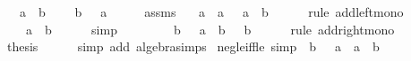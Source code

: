 \begin{isabellebody}
\ \ \ {\isachardoublequoteopen}a\ {\isasymle}\ b{\isachardoublequoteclose}\isanewline
\ \ \ {\isachardoublequoteopen}{\isacharminus}{\kern0pt}\ b\ {\isasymle}\ {\isacharminus}{\kern0pt}\ a{\isachardoublequoteclose}\isanewline
%
\isadelimproof
%
\endisadelimproof
%
\isatagproof
{}\isamarkupfalse%
\ {\isacharminus}{\kern0pt}\isanewline
\ \ \isamarkupfalse%
\ assms\ \isamarkupfalse%
\ {\isachardoublequoteopen}{\isacharminus}{\kern0pt}\ a\ {\isacharplus}{\kern0pt}\ a\ {\isasymle}\ {\isacharminus}{\kern0pt}\ a\ {\isacharplus}{\kern0pt}\ b{\isachardoublequoteclose}\isanewline
\ \ \ \ \isamarkupfalse%
\ {\isacharparenleft}{\kern0pt}rule\ add{\isacharunderscore}{\kern0pt}left{\isacharunderscore}{\kern0pt}mono{\isacharparenright}{\kern0pt}\isanewline
\ \ \isamarkupfalse%
\ \isamarkupfalse%
\ {\isachardoublequoteopen}{}\ {\isasymle}\ {\isacharminus}{\kern0pt}\ a\ {\isacharplus}{\kern0pt}\ b{\isachardoublequoteclose}\isanewline
\ \ \ \ \isamarkupfalse%
\ simp\isanewline
\ \ \isamarkupfalse%
\ \isamarkupfalse%
\ {\isachardoublequoteopen}{}\ {\isacharplus}{\kern0pt}\ {\isacharparenleft}{\kern0pt}{\isacharminus}{\kern0pt}\ b{\isacharparenright}{\kern0pt}\ {\isasymle}\ {\isacharparenleft}{\kern0pt}{\isacharminus}{\kern0pt}\ a\ {\isacharplus}{\kern0pt}\ b{\isacharparenright}{\kern0pt}\ {\isacharplus}{\kern0pt}\ {\isacharparenleft}{\kern0pt}{\isacharminus}{\kern0pt}\ b{\isacharparenright}{\kern0pt}{\isachardoublequoteclose}\isanewline
\ \ \ \ \isamarkupfalse%
\ {\isacharparenleft}{\kern0pt}rule\ add{\isacharunderscore}{\kern0pt}right{\isacharunderscore}{\kern0pt}mono{\isacharparenright}{\kern0pt}\isanewline
\ \ \isamarkupfalse%
\ \isamarkupfalse%
\ {\isacharquery}{\kern0pt}thesis\isanewline
\ \ \ \ \isamarkupfalse%
\ {\isacharparenleft}{\kern0pt}simp\ add{\isacharcolon}{\kern0pt}\ algebra{\isacharunderscore}{\kern0pt}simps{\isacharparenright}{\kern0pt}\isanewline
{}\isamarkupfalse%
%
\endisatagproof
{\isafoldproof}%
%
\isadelimproof
\isanewline
%
\endisadelimproof
\isanewline
{}\isamarkupfalse%
\ neg{\isacharunderscore}{\kern0pt}le{\isacharunderscore}{\kern0pt}iff{\isacharunderscore}{\kern0pt}le\ {\isacharbrackleft}{\kern0pt}simp{\isacharbrackright}{\kern0pt}{\isacharcolon}{\kern0pt}\ {\isachardoublequoteopen}{\isacharminus}{\kern0pt}\ b\ {\isasymle}\ {\isacharminus}{\kern0pt}\ a\ {\isasymlongleftrightarrow}\ a\ {\isasymle}\ b{\isachardoublequoteclose}\isanewline

\end{isabellebody}
